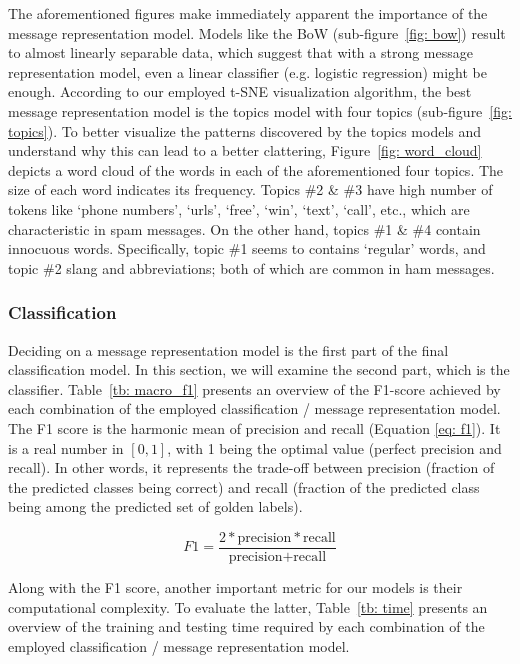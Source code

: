 \documentclass[letterpaper]{article}
\begin{document}
The aforementioned figures make immediately apparent the importance of the message representation model. Models like the BoW (sub-figure~\ref{fig: bow}) result to almost linearly separable data, which suggest that with a strong message representation model, even a linear classifier (e.g. logistic regression) might be enough. According to our employed t-SNE visualization algorithm, the best message representation model is the topics model with four topics (sub-figure~\ref{fig: topics}). To better visualize the patterns discovered by the topics models and understand why this can lead to a better clattering, Figure~\ref{fig: word_cloud} depicts a word cloud of the words in each of the aforementioned four topics. The size of each word indicates its frequency. Topics \#2 \& \#3 have high number of tokens like `phone numbers', `urls', `free', `win', `text', `call', etc., which are characteristic in spam messages. On the other hand, topics \#1 \& \#4 contain innocuous words. Specifically, topic \#1 seems to contains `regular' words, and topic \#2 slang and abbreviations; both of which are common in ham messages.

\subsubsection{Classification}  \label{Classification Results}

Deciding on a message representation model is the first part of the final classification model. In this section, we will examine the second part, which is the classifier. Table~\ref{tb: macro_f1} presents an overview of the F1-score achieved by each combination of the employed classification / message representation model. The F1 score is the harmonic mean of precision and recall (Equation \ref{eq: f1}). It is a real number in $[0, 1]$, with 1 being the optimal value (perfect precision and recall). In other words, it represents the trade-off between precision (fraction of the predicted classes being correct) and recall (fraction of the predicted class being among the predicted set of golden labels).

\begin{equation} \label{eq: f1}
	F1 = \frac{2 * \text{precision} * \text{recall}}{\text{precision} + \text{recall}}
\end{equation}

Along with the F1 score, another important metric for our models is their computational complexity. To evaluate the latter, Table~\ref{tb: time} presents an overview of the training and testing time required by each combination of the employed classification / message representation model.
\end{document}
